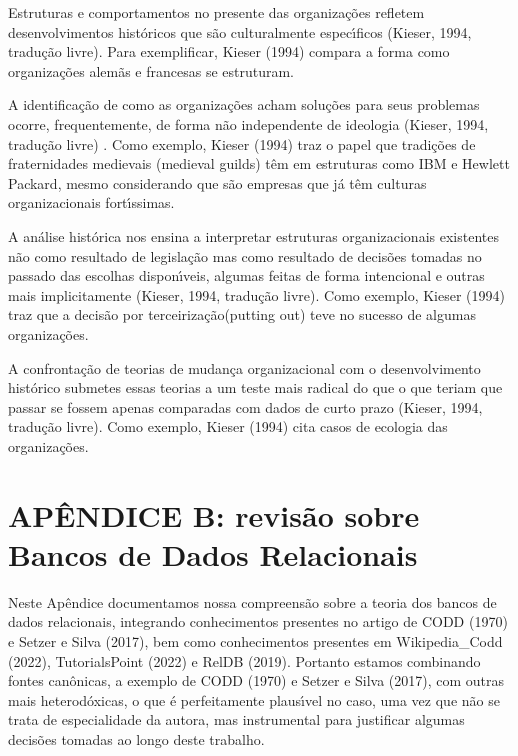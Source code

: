 \documentclass[
12pt,		%
openright,	%
twoside,  %
a4paper,			%
chapter=TITLE,		%
english,			%
french,				%
spanish,			%
brazil				%
]{USPSC-classe/USPSC}
\begin{document}
\begin{alineas}
\item Estruturas e comportamentos no presente das organiza\c{c}\~oes refletem desenvolvimentos hist\'oricos que s\~ao culturalmente espec\'{\i}ficos  (Kieser, 1994, tradu\c{c}\~ao livre). Para exemplificar,  Kieser (1994) compara a forma como organiza\c{c}\~oes alem\~as e francesas se estruturam.
\item A identifica\c{c}\~ao de como as organiza\c{c}\~oes acham solu\c{c}\~oes para seus problemas ocorre, frequentemente, de forma n\~ao independente de ideologia  (Kieser, 1994, tradu\c{c}\~ao livre) . Como exemplo,  Kieser (1994) traz o papel  que tradi\c{c}\~oes de fraternidades medievais (medieval guilds) t\^em em estruturas como IBM e Hewlett Packard, mesmo considerando que s\~ao empresas que j\'a t\^em culturas organizacionais fort\'{\i}ssimas.
\item A an\'alise hist\'orica nos ensina a interpretar estruturas organizacionais existentes n\~ao como resultado de legisla\c{c}\~ao mas como resultado de decis\~oes tomadas no passado das escolhas dispon\'{\i}veis, algumas feitas de forma intencional e outras mais implicitamente  (Kieser, 1994, tradu\c{c}\~ao livre). Como exemplo,  Kieser (1994) traz que a decis\~ao por \textquotedbl terceiriza\c{c}\~ao\textquotedbl  (putting out) teve no sucesso de algumas organiza\c{c}\~oes.
\item A confronta\c{c}\~ao de teorias de mudan\c{c}a organizacional com o desenvolvimento hist\'orico submetes essas teorias a um teste mais radical do que o que teriam que passar se fossem apenas comparadas com dados de curto prazo (Kieser, 1994, tradu\c{c}\~ao livre). Como exemplo,  Kieser (1994) cita casos de ecologia das organiza\c{c}\~oes.
\end{alineas}

\chapter[AP\^ENDICE B: revis\~ao sobre Bancos de Dados Relacionais]{AP\^ENDICE B: revis\~ao sobre Bancos de Dados Relacionais}\label{AP\^ENDICE B: revis\~ao sobre Bancos de Dados Relacionais}
Neste Ap\^endice documentamos nossa compreens\~ao sobre a teoria dos bancos de dados relacionais, integrando conhecimentos presentes no artigo de  CODD (1970) e  Setzer e Silva (2017), bem como conhecimentos presentes em Wikipedia\_Codd (2022),  TutorialsPoint (2022) e  RelDB (2019). Portanto estamos combinando fontes can\^onicas, a exemplo de  CODD (1970) e Setzer e Silva (2017), com outras mais heterod\'oxicas, o que \'e perfeitamente plaus\'{\i}vel no caso, uma vez que n\~ao se trata de especialidade da autora, mas instrumental para justificar algumas decis\~oes tomadas ao longo deste trabalho.
\end{document}

